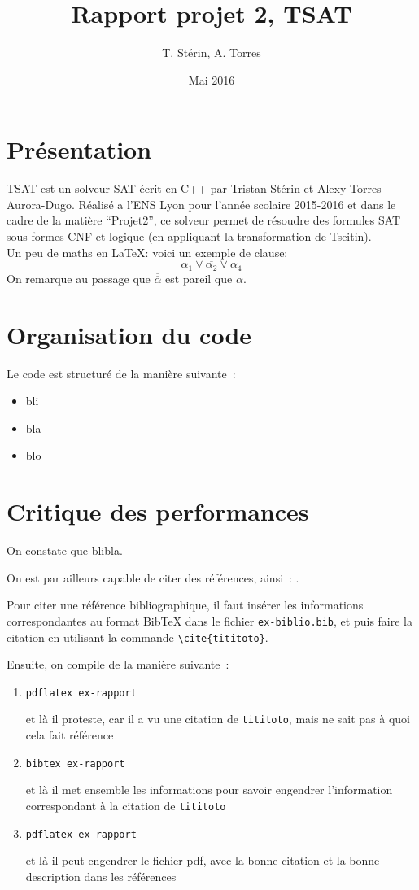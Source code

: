 \documentclass{article}
\title{Rapport projet 2, TSAT}
\author{T. Stérin, A. Torres}
\date{Mai 2016}
\newcommand{\litt}{\alpha}
\newcommand{\non}[1]{\overline{#1}}
\begin{document}
\maketitle

\section{Présentation}
TSAT est un solveur SAT écrit en C++ par Tristan Stérin et Alexy Torres--Aurora-Dugo.
Réalisé a l'ENS Lyon pour l'année scolaire 2015-2016 et dans le cadre de la matière ``Projet2'', ce solveur permet de résoudre des formules SAT sous formes CNF et logique (en appliquant la transformation de Tseitin).
\\



Un peu de maths en \LaTeX: voici un exemple de clause:
$$
\litt_1\lor\non{\litt_2}\lor\litt_4
$$
On remarque au passage que $\non{\non{\litt}}$ est pareil que $\litt$.

\section{Organisation du code}
\label{s:orga}

Le code est structuré de la manière suivante~:
\begin{itemize}
\item bli
\item bla
\item blo
\end{itemize}

\section{Critique des performances}

On constate que blibla.


On est par ailleurs capable de citer des références, ainsi~: \cite{ProjInt16}.


Pour citer une référence bibliographique, il faut insérer les
informations correspondantes au format BibTeX dans le fichier
\texttt{ex-biblio.bib}, et puis faire la citation en utilisant la
commande \verb+\cite{tititoto}+.

Ensuite, on compile de la manière suivante~:
\begin{enumerate}
\item \texttt{pdflatex ex-rapport}

et là il proteste, car il a vu une citation de \texttt{tititoto}, mais
ne sait pas à quoi cela fait référence

\item \texttt{bibtex ex-rapport}

et là il met ensemble les informations pour savoir engendrer
l'information correspondant à la citation de \texttt{tititoto}

\item \texttt{pdflatex ex-rapport}

et là il peut engendrer le fichier pdf, avec la bonne citation et la
bonne description dans les références
\end{enumerate}




\end{document}
